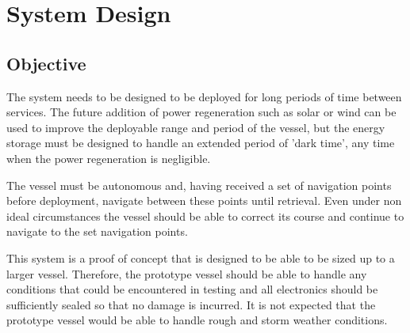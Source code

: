 \section{System Design}
	\subsection{Objective}
	The system needs to be designed to be deployed for long periods of time between services. The future addition of power regeneration such as solar or wind can be used to improve the deployable range and period of the vessel, but the energy storage must be designed to handle an extended period of 'dark time', any time when the power regeneration is negligible. \par
	The vessel must be autonomous and, having received a set of navigation points before deployment, navigate between these points until retrieval. Even under non ideal circumstances the vessel should be able to correct its course and continue to navigate to the set navigation points. \par
	This system is a proof of concept that is designed to be able to be sized up to a larger vessel. Therefore, the prototype vessel should be able to handle any conditions that could be encountered in testing and all electronics should be sufficiently sealed so that no damage is incurred. It is not expected that the prototype vessel would be able to handle rough and storm weather conditions.\par
